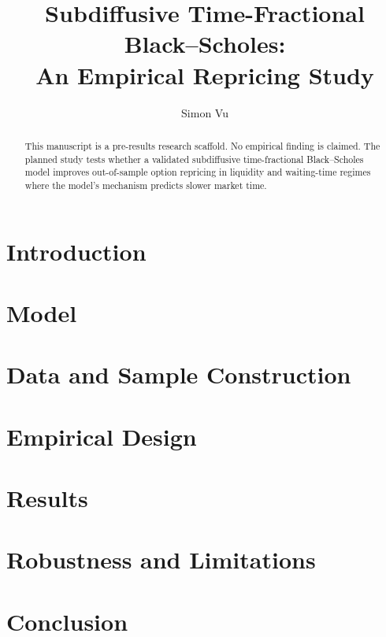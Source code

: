 \documentclass[11pt]{article}
\title{Subdiffusive Time-Fractional Black--Scholes:\\An Empirical Repricing Study}
\author{Simon Vu}
\date{}
\begin{document}
\maketitle

\begin{abstract}
This manuscript is a pre-results research scaffold. No empirical finding is
claimed. The planned study tests whether a validated subdiffusive
time-fractional Black--Scholes model improves out-of-sample option repricing in
liquidity and waiting-time regimes where the model's mechanism predicts slower
market time.
\end{abstract}

\section{Introduction}

\section{Model}

\section{Data and Sample Construction}

\section{Empirical Design}

\section{Results}

\section{Robustness and Limitations}

\section{Conclusion}
\end{document}
